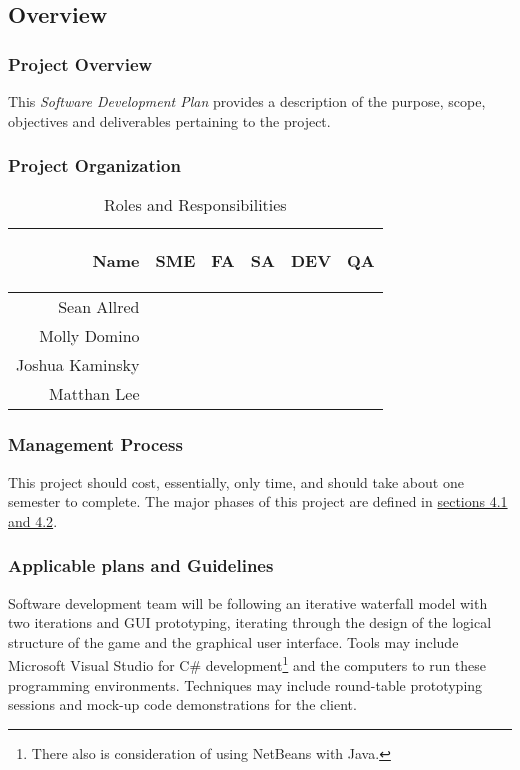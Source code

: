 \documentclass[12pt]{article}
\begin{document}
\subsection{Overview}

{
\subsubsection{Project Overview}
This \emph{Software Development Plan} provides a description of the purpose,
scope, objectives and deliverables pertaining to the project.

\newcommand{\gy}{\checkmark}
\newcommand{\sdwb}[1]{\begin{sideways}\textbf{#1}\end{sideways}}
\subsubsection{Project Organization}
\begin{table}[!h]
\centering
\begin{tabular}{r|ccccc}
\textbf{Name} & \sdwb{SME} & \sdwb{FA} & \sdwb{SA} & \sdwb{DEV} & \sdwb{QA} \\ 
\hline 
Sean Allred & \null & \gy & \gy & \gy & \gy \\ 
Molly Domino & \gy & \null & \gy & \gy & \gy \\ 
Joshua Kaminsky & \gy & \gy & \gy & \null & \gy \\ 
Matthan Lee & \gy & \gy & \null & \gy & \gy \\ 
\end{tabular}
\caption{Roles and Responsibilities}
\end{table}

}

\subsubsection{Management Process}
This project should cost, essentially, only time, and should take about one
semester to complete.  The major phases of this project are defined in
\hyperref[sec:schedule]{sections 4.1 and 4.2}.

\subsubsection{Applicable plans and Guidelines}
Software development team will be following an iterative waterfall model with
two iterations and GUI prototyping, iterating through the design of the logical
structure of the game and the graphical user interface. Tools may include
Microsoft Visual Studio for C\# development\footnote{There also is
consideration of using NetBeans with Java.} and the computers to run these
programming environments. Techniques may include round-table prototyping
sessions and mock-up code demonstrations for the client.
\end{document}
